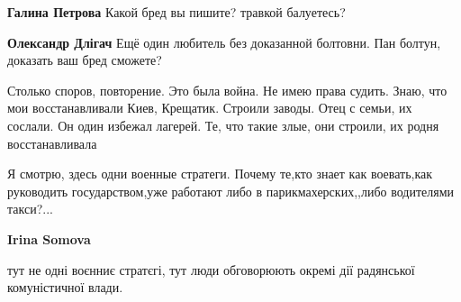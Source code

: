 \begin{itemize}
\begin{itemize}
\begin{itemize}
 
\textbf{Галина Петрова} Какой бред вы пишите? травкой балуетесь?


 
\textbf{Олександр Длігач} Ещё один любитель без доказанной болтовни. Пан болтун, доказать ваш бред сможете?

\end{itemize}

 

Столько споров, повторение. Это была война. Не имею права судить. Знаю, что мои
восстанавливали Киев, Крещатик. Строили заводы. Отец с семьи, их сослали. Он
один избежал лагерей. Те, что такие злые, они строили, их родня восстанавливала
\end{itemize}

 
Я смотрю, здесь одни военные стратеги.
Почему те,кто знает как воевать,как руководить государством,уже работают либо в парикмахерских,,либо водителями такси?...

\begin{itemize}
 
\textbf{Irina Somova} 

тут не одні воєнниє стратєгі, тут люди обговорюють окремі дії радянської
комуністичної влади.




\end{itemize}
\end{itemize}
